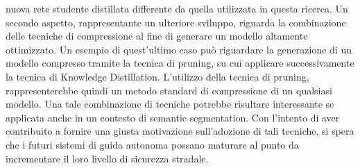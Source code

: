 nuova rete studente distillata differente da quella utilizzata in questa ricerca. 
Un secondo aspetto, rappresentante un ulteriore sviluppo, riguarda la 
combinazione delle tecniche di compressione al fine di generare un modello 
altamente ottimizzato. Un esempio di quest'ultimo caso può riguardare la 
generazione di un modello compresso tramite la tecnica di pruning, su cui 
applicare successivamente la tecnica di Knowledge Distillation. L'utilizzo 
della tecnica di pruning, rappresenterebbe quindi un metodo standard di 
compressione di un qualsiasi modello. Una tale combinazione di tecniche 
potrebbe risultare interessante se applicata anche in un contesto di semantic 
segmentation. Con l'intento di aver contribuito a fornire una giusta 
motivazione sull'adozione di tali tecniche, si spera che i futuri sistemi di 
guida autonoma possano maturare al punto da incrementare il loro livello 
di sicurezza stradale.


